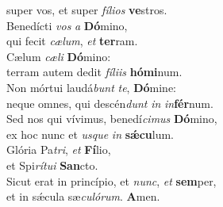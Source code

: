 \oddverse super vos, et super \textit{fí}\textit{li}\textit{os} \textbf{ve}stros.\\
\evenverse Benedícti \textit{vos} \textit{a} \textbf{Dó}mino,~\*\\
\evenverse qui fecit \textit{cæ}\textit{lum}, \textit{et} \textbf{ter}ram.\\
\oddverse Cælum \textit{cæ}\textit{li} \textbf{Dó}mino:~\*\\
\oddverse terram autem dedit \textit{fí}\textit{li}\textit{is} \textbf{hó}\textbf{mi}num.\\
\evenverse Non mórtui laudá\textit{bunt} \textit{te}, \textbf{Dó}mine:~\*\\
\evenverse neque omnes, qui descén\textit{dunt} \textit{in} \textit{in}\textbf{fér}num.\\
\oddverse Sed nos qui vívimus, benedí\textit{ci}\textit{mus} \textbf{Dó}mino,~\*\\
\oddverse ex hoc nunc et \textit{us}\textit{que} \textit{in} \textbf{sǽ}\textbf{cu}lum.\\
\evenverse Glória Pa\textit{tri}, \textit{et} \textbf{Fí}lio,~\*\\
\evenverse et Spi\textit{rí}\textit{tu}\textit{i} \textbf{San}cto.\\
\oddverse Sicut erat in princípio, et \textit{nunc}, \textit{et} \textbf{sem}per,~\*\\
\oddverse et in sǽcula sæ\textit{cu}\textit{ló}\textit{rum}. \textbf{A}men.\\
